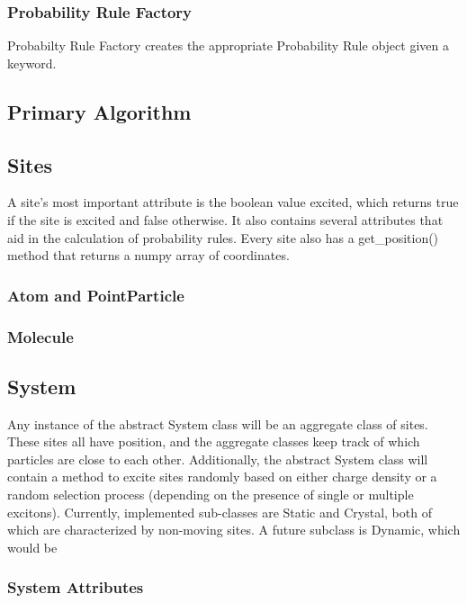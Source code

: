 \documentclass{article}
\begin{document}
\subsubsection{Probability Rule Factory}

Probabilty Rule Factory creates the appropriate Probability Rule object given a keyword.




\subsection{Primary Algorithm}




\subsection{Sites}

A site's most important attribute is the boolean value excited, which returns true if the site is excited and false otherwise. It also contains several attributes that aid in the calculation of probability rules. Every site also has a get\_position() method that returns a numpy array of coordinates.

\subsubsection{Atom and PointParticle}



\subsubsection{Molecule}

\subsection{System}

Any instance of the abstract System class will be an aggregate class of sites. These sites all have position, and the aggregate classes keep track of which particles are close to each other. Additionally, the abstract System class will contain a method to excite sites randomly based on either charge density or a random selection process (depending on the presence of single or multiple excitons). Currently, implemented sub-classes are Static and Crystal, both of which are characterized by non-moving sites. A future subclass is Dynamic, which would be 

\subsubsection{System Attributes}
\end{document}
